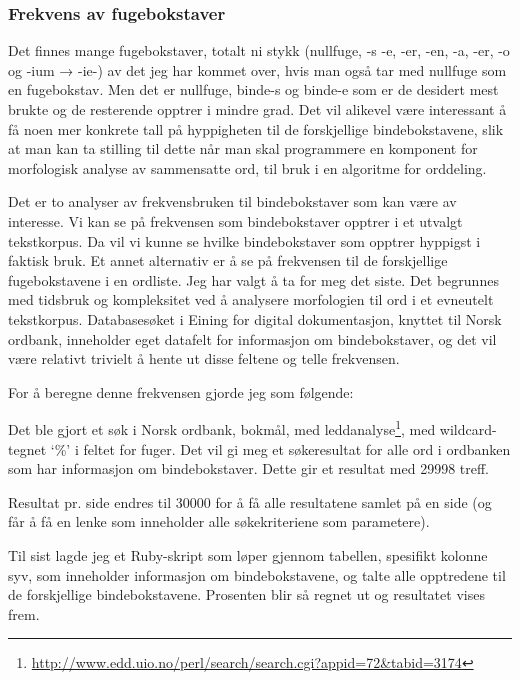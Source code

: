 \subsubsection{Frekvens av fugebokstaver}
\label{sec:fuge-frekvens}

Det finnes mange fugebokstaver, totalt ni stykk (nullfuge, -s -e, -er, -en, -a, -er, -o og -ium → -ie-)\cite{faarlund1997norsk,bindebokstaver} av det jeg har kommet over, hvis man også tar med nullfuge som en fugebokstav. Men det er nullfuge, binde-s og binde-e som er de desidert mest brukte og de resterende opptrer i mindre grad. Det vil alikevel være interessant å få noen mer konkrete tall på hyppigheten til de forskjellige bindebokstavene, slik at man kan ta stilling til dette når man skal programmere en komponent for morfologisk analyse av sammensatte ord, til bruk i en algoritme for orddeling.

Det er to analyser av frekvensbruken til bindebokstaver som kan være av interesse. Vi kan se på frekvensen som bindebokstaver opptrer i et utvalgt tekstkorpus. Da vil vi kunne se hvilke bindebokstaver som opptrer hyppigst i faktisk bruk. Et annet alternativ er å se på frekvensen til de forskjellige fugebokstavene i en ordliste. Jeg har valgt å ta for meg det siste. Det begrunnes med tidsbruk og kompleksitet ved å analysere morfologien til ord i et evneutelt tekstkorpus. Databasesøket i Eining for digital dokumentasjon, knyttet til Norsk ordbank, inneholder eget datafelt for informasjon om bindebokstaver, og det vil være relativt trivielt å hente ut disse feltene og telle frekvensen. 

For å beregne denne frekvensen gjorde jeg som følgende:

\begin{items}
	\item Det ble gjort et søk i Norsk ordbank, bokmål, med leddanalyse\footnote{\url{http://www.edd.uio.no/perl/search/search.cgi?appid=72&tabid=3174}}, med wildcard-tegnet ‘\%’ i feltet for fuger. Det vil gi meg et søkeresultat for alle ord i ordbanken som har informasjon om bindebokstaver. Dette gir et resultat med 29998 treff.
	\item Resultat pr. side endres til 30000 for å få alle resultatene samlet på en side (og får å få en lenke som inneholder alle søkekriteriene som parametere).
	\item Til sist lagde jeg et Ruby-skript som løper gjennom tabellen, spesifikt kolonne syv, som inneholder informasjon om bindebokstavene, og talte alle opptredene til de forskjellige bindebokstavene. Prosenten blir så regnet ut og resultatet vises frem.
\end{items}

